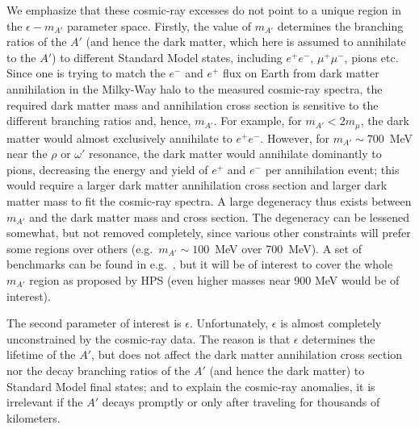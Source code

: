 We emphasize that these cosmic-ray excesses do not point to a unique region in the $\epsilon-m_{A'}$ parameter space.  
Firstly, the value of $m_{A'}$ determines the branching ratios of the $A'$ (and hence the dark matter, which here is assumed to annihilate to 
the $A'$) to different Standard Model states, including $e^+e^-$, $\mu^+\mu^-$, pions etc.  Since one is trying to match the $e^-$ and 
$e^+$ flux on Earth from dark matter annihilation in the Milky-Way halo to the measured cosmic-ray spectra, the required dark matter 
mass and annihilation cross section is sensitive to the different branching ratios and, hence, $m_{A'}$.   For example, for 
$m_{A'} < 2 m_{\mu}$, the dark matter would almost exclusively annihilate to $e^+e^-$.   However, for $m_{A'} \sim 700$~MeV near the 
$\rho$ or $\omega'$ resonance, the dark matter would annihilate dominantly to pions, decreasing the energy and yield of 
$e^+$ and $e^-$ per annihilation event; this would require a larger dark matter annihilation cross section and larger dark matter mass 
to fit the cosmic-ray spectra.  A large degeneracy thus exists between $m_{A'}$ and the dark matter mass and cross section.  
The degeneracy can be lessened somewhat, but not removed completely, since various other constraints will prefer some regions 
over others (e.g.~$m_{A'}\sim 100$~MeV over 700~MeV).  A set of benchmarks can be found in e.g.~\cite{Finkbeiner:2010sm}, but it will be of interest to cover the whole $m_{A'}$ region as proposed by HPS (even higher masses near 900 MeV would be of interest).  

The second parameter of interest is $\epsilon$.  Unfortunately, $\epsilon$ is almost completely unconstrained by the cosmic-ray data.  The reason is that $\epsilon$ determines the lifetime of the $A'$, but does not affect the dark matter annihilation cross section nor the decay branching ratios of the $A'$ (and hence the dark matter) to Standard Model final states;  and to explain the cosmic-ray anomalies, it is 
irrelevant if the $A'$ decays promptly or only after traveling for thousands of kilometers.  

